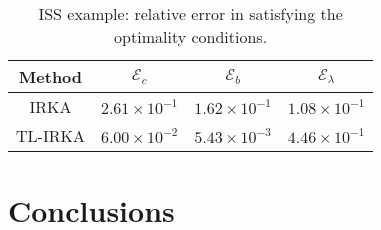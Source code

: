 \documentclass[a4paper,11pt, twoside]{article}
\makeatletter
\newcommand{\cE}{\ensuremath{\mathcal{E}}}
\newcommand{\includetikz}[1]{%
	\tikzsetnextfilename{figure/#1}%
}
\newenvironment{customlegend}[1][]{%
	\begingroup
	\csname pgfplots@init@cleared@structures\endcsname
	\pgfplotsset{#1}%
}{%
	\csname pgfplots@createlegend\endcsname
	\endgroup
}%
\def\addlegendimage{\csname pgfplots@addlegendimage\endcsname}
\newlength\fheight
\newlength\fwidth
\makeatother
\begin{document}
	\begin{table}[H]
	\centering
	\begin{tabular}{|c|c|c|c|}
		\hline
		Method & $\cE_c$ & $\cE_b$ & $\cE_\lambda$\\ \hline
		IRKA & $2.61\times 10^{-1}$ & $1.62\times 10^{-1}$ & $1.08 \times 10^{-1}$\\ 
		\hline
		TL-IRKA &  $6.00\times 10^{-2}$ & $5.43\times 10^{-3}$ & $ 4.46\times 10^{-1}$\\
		\hline
	\end{tabular}
	\caption{ISS example: relative error in satisfying the optimality conditions.}
\label{tab:ISS_opt_1s}
\end{table}


%

\section{Conclusions}
\end{document}
